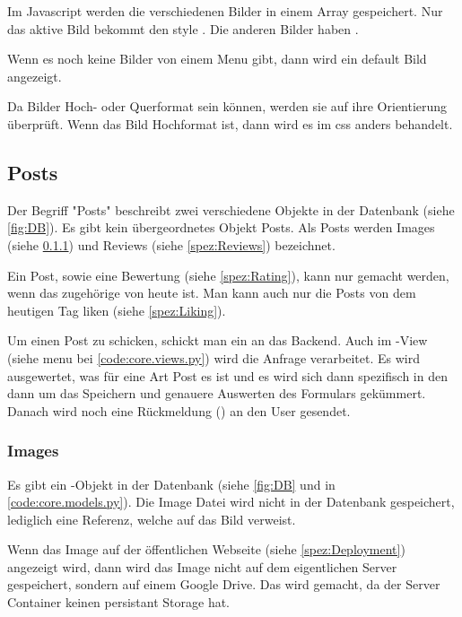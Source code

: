 Im Javascript werden die verschiedenen Bilder in einem Array gespeichert. Nur
das aktive Bild bekommt den style . Die anderen Bilder
haben .

Wenn es noch keine Bilder von einem Menu gibt, dann wird ein default Bild
angezeigt.

Da Bilder Hoch- oder Querformat sein können, werden sie auf ihre Orientierung
überprüft. Wenn das Bild Hochformat ist, dann wird es im css anders
behandelt.

\subsection{Posts} \label{spez:Posts}

Der Begriff "Posts" beschreibt zwei verschiedene Objekte in der Datenbank (siehe
\ref{fig:DB}). Es gibt kein übergeordnetes Objekt Posts. Als Posts werden Images
(siehe \ref{spez:Images}) und Reviews (siehe \ref{spez:Reviews}) bezeichnet.

Ein Post, sowie eine Bewertung (siehe \ref{spez:Rating}), kann nur gemacht
werden, wenn das zugehörige  von heute ist. Man kann auch nur die
Posts von dem heutigen Tag liken (siehe \ref{spez:Liking}).

Um einen Post zu schicken, schickt man ein  an das Backend.
Auch im -View (siehe menu bei {\ref{code:core.views.py}}) wird die
Anfrage verarbeitet. Es wird ausgewertet, was für eine Art Post es ist und es
wird sich dann spezifisch in den  dann um das Speichern
und genauere Auswerten des Formulars gekümmert. Danach wird noch eine
Rückmeldung () an den User gesendet.

\subsubsection{Images} \label{spez:Images}

Es gibt ein -Objekt in der Datenbank (siehe \ref{fig:DB} und in
\ref{code:core.models.py}). Die Image Datei wird nicht in der Datenbank
gespeichert, lediglich eine Referenz, welche auf das Bild verweist.

Wenn das Image auf der öffentlichen Webseite (siehe \ref{spez:Deployment}) angezeigt wird, dann
wird das Image nicht auf dem eigentlichen Server gespeichert, sondern auf einem
Google Drive. Das wird gemacht, da der Server Container keinen persistant
Storage hat.

